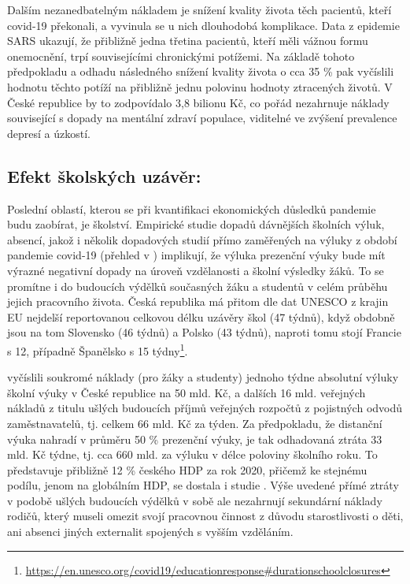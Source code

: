 Dalším nezanedbatelným nákladem je snížení kvality života těch pacientů, kteří covid-19 překonali, a vyvinula se u nich dlouhodobá komplikace. Data z epidemie SARS ukazují, že přibližně jedna třetina pacientů, kteří měli vážnou formu onemocnění, trpí souvisejícími chronickými potížemi. Na základě tohoto předpokladu a odhadu následného snížení kvality života o cca 35 \% pak \cite{Cutler2020} vyčíslili hodnotu těchto potíží na přibližně jednu polovinu hodnoty ztracených životů. V České republice by to zodpovídalo 3,8 bilionu Kč, co pořád nezahrnuje náklady související s dopady na mentální zdraví populace, viditelné ve zvýšení prevalence depresí a úzkostí.

\subsection*{Efekt školských uzávěr:} 

Poslední oblastí, kterou se při kvantifikaci ekonomických důsledků pandemie budu zaobírat, je školství. Empirické studie dopadů dávnějších školních výluk, absencí, jakož i několik dopadových studií přímo zaměřených na výluky z období pandemie covid-19 (přehled v \cite{Jann2021}) implikují, že výluka prezenční výuky bude mít výrazné negativní dopady na úroveň vzdělanosti a školní výsledky žáků. To se promítne i do budoucích výdělků současných žáku a studentů v celém průběhu jejich pracovního života. Česká republika má přitom dle dat UNESCO  z krajin EU nejdelší reportovanou celkovou délku uzávěry škol (47 týdnů), když obdobně jsou na tom Slovensko (46 týdnů) a Polsko (43 týdnů), naproti tomu stojí Francie s 12, případně Španělsko s 15 týdny\footnote{\url{https://en.unesco.org/covid19/educationresponse\#durationschoolclosures}}.

\cite{Jann2021} vyčíslili soukromé náklady (pro žáky a studenty) jednoho týdne absolutní výluky školní výuky v České republice na 50 mld. Kč, a dalších 16 mld. veřejných nákladů z titulu ušlých budoucích příjmů veřejných rozpočtů z pojistných odvodů zaměstnavatelů, tj. celkem 66 mld. Kč za týden. Za předpokladu, že distanční výuka nahradí v průměru 50 \% prezenční výuky, je tak odhadovaná ztráta 33 mld. Kč týdne, tj. cca 660 mld. za výluku v délce poloviny školního roku. To představuje přibližně 12 \% českého HDP za rok 2020, přičemž ke stejnému podílu, jenom na globálním HDP, se dostala i studie \cite{Azevedo2020}. Výše uvedené přímé ztráty v podobě ušlých budoucích výdělků v sobě ale nezahrnují sekundární náklady rodičů, který museli omezit svojí pracovnou činnost z důvodu starostlivosti o děti, ani absenci jiných externalit spojených s vyšším vzděláním.

